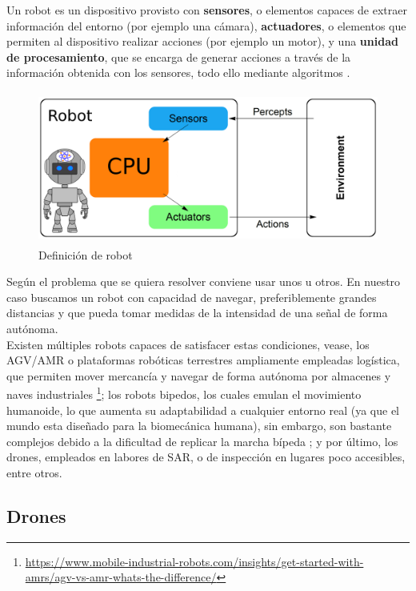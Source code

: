 Un robot es un dispositivo provisto con \textbf{sensores}, o elementos capaces de extraer información del entorno (por ejemplo una cámara), \textbf{actuadores}, o elementos que permiten al dispositivo realizar acciones (por ejemplo un motor), y una \textbf{unidad de procesamiento}, que se encarga de generar acciones a través de la información obtenida con los sensores, todo ello mediante algoritmos \cite{Wang2022}.\\

\begin{figure} [H]
	\begin{center}
	\includegraphics[height=5cm]{imagenes/cap1/3_robot.png}
	\end{center}
	\caption[Definición de robot]{Definición de robot}
	\label{fig:robot_def}
\end{figure}

Según el problema que se quiera resolver conviene usar unos u otros. En nuestro caso buscamos un robot con capacidad de navegar, preferiblemente grandes distancias y que pueda tomar medidas de la intensidad de una señal de forma autónoma.\\

Existen múltiples robots capaces de satisfacer estas condiciones, vease, los \ac{AGV}/\ac{AMR} o plataformas robóticas terrestres ampliamente empleadas logística, que permiten mover mercancía y navegar de forma autónoma por almacenes y naves industriales \footnote[6]{\url{https://www.mobile-industrial-robots.com/insights/get-started-with-amrs/agv-vs-amr-whats-the-difference/}}; los robots bipedos, los cuales emulan el movimiento humanoide, lo que aumenta su adaptabilidad a cualquier entorno real (ya que el mundo esta diseñado para la biomecánica humana), sin embargo, son bastante complejos debido a la dificultad de replicar la marcha bípeda \cite{10.3389/fmech.2020.00011}; y por último, los drones, empleados en labores de \ac{SAR}, o de inspección en lugares poco accesibles, entre otros.

\subsection{Drones}
\label{subsec:drones}

